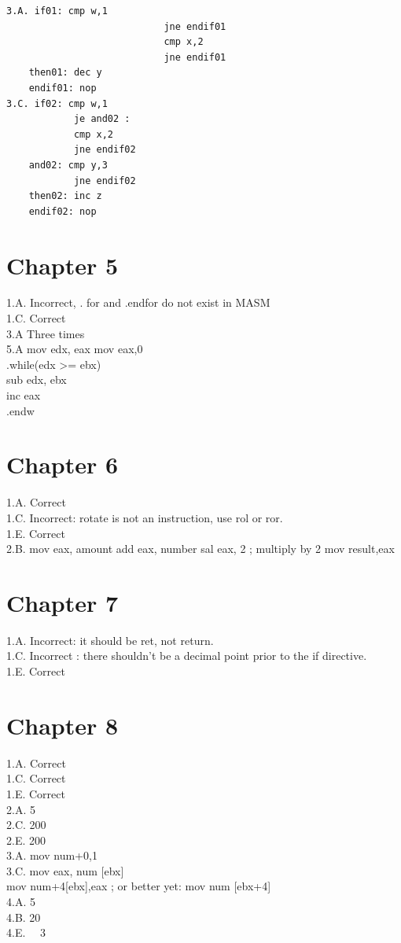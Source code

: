 \documentclass[10pt]{article}
\begin{document}
\begin{verbatim}
3.A. if01: cmp w,1
                            jne endif01
                            cmp x,2
                            jne endif01
    then01: dec y
    endif01: nop
3.C. if02: cmp w,1
            je and02 :
            cmp x,2
            jne endif02
    and02: cmp y,3
            jne endif02
    then02: inc z
    endif02: nop
\end{verbatim}

\section*{Chapter 5}
1.A. Incorrect, . for and .endfor do not exist in MASM\\
1.C. Correct\\
3.A Three times\\
5.A mov edx, eax mov eax,0\\
.while(edx >= ebx)\\
sub edx, ebx\\
inc eax\\
.endw

\section*{Chapter 6}
1.A. Correct\\
1.C. Incorrect: rotate is not an instruction, use rol or ror.\\
1.E. Correct\\
2.B. mov eax, amount add eax, number sal eax, 2 ; multiply by 2 mov result,eax

\section*{Chapter 7}
1.A. Incorrect: it should be ret, not return.\\
1.C. Incorrect : there shouldn't be a decimal point prior to the if directive.\\
1.E. Correct

\section*{Chapter 8}
1.A. Correct\\
1.C. Correct\\
1.E. Correct\\
2.A. 5\\
2.C. 200\\
2.E. 200\\
3.A. mov num+0,1\\[0pt]
3.C. mov eax, num [ebx]\\[0pt]
mov num+4[ebx],eax ; or better yet: mov num [ebx+4]\\
4.A. 5\\
4.B. 20\\
4.E. $\quad 3$
\end{document}
